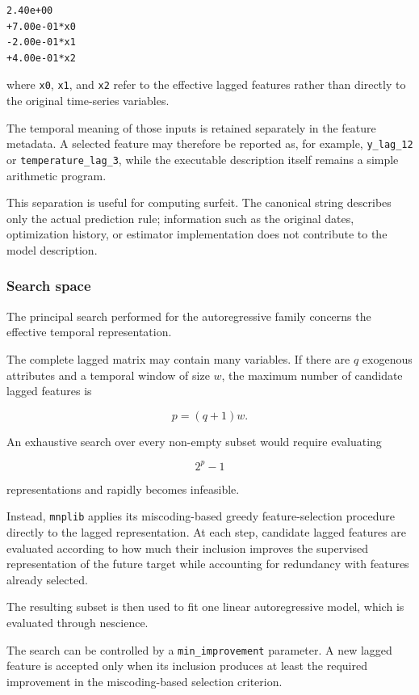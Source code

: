 \begin{verbatim}
2.40e+00
+7.00e-01*x0
-2.00e-01*x1
+4.00e-01*x2
\end{verbatim}

where \texttt{x0}, \texttt{x1}, and \texttt{x2} refer to the effective lagged
features rather than directly to the original time-series variables.

The temporal meaning of those inputs is retained separately in the feature
metadata. A selected feature may therefore be reported as, for example,
\texttt{y\_lag\_12} or \texttt{temperature\_lag\_3}, while the executable
description itself remains a simple arithmetic program.

This separation is useful for computing surfeit. The canonical string describes
only the actual prediction rule; information such as the original dates,
optimization history, or estimator implementation does not contribute to the
model description.

\subsubsection{Search space}

The principal search performed for the autoregressive family concerns the
effective temporal representation.

The complete lagged matrix may contain many variables. If there are \(q\)
exogenous attributes and a temporal window of size \(w\), the maximum number
of candidate lagged features is

\[
p=(q+1)w.
\]

An exhaustive search over every non-empty subset would require evaluating

\[
2^p-1
\]

representations and rapidly becomes infeasible.

Instead, \texttt{mnplib} applies its miscoding-based greedy feature-selection
procedure directly to the lagged representation. At each step, candidate lagged
features are evaluated according to how much their inclusion improves the
supervised representation of the future target while accounting for redundancy
with features already selected.

The resulting subset is then used to fit one linear autoregressive model, which
is evaluated through nescience.

The search can be controlled by a \texttt{min\_improvement} parameter. A new
lagged feature is accepted only when its inclusion produces at least the required
improvement in the miscoding-based selection criterion.

